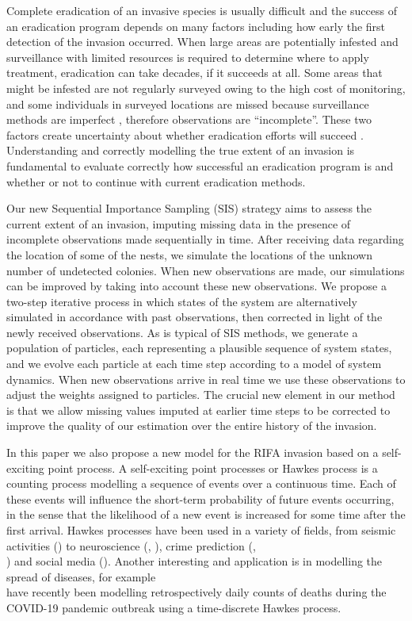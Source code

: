 \documentclass{article}
\begin{document}
Complete eradication of an invasive species is usually difficult and the success of an eradication program depends on many factors including how early the first detection of the invasion occurred. When large areas are potentially infested and surveillance with limited resources is required to determine where to apply treatment, eradication can take decades, if it succeeds at all. Some areas that might be infested are not regularly surveyed owing to the high cost of monitoring, and some individuals in surveyed locations are missed because surveillance methods are imperfect \cite{Royle}, therefore observations are “incomplete”. These two factors create uncertainty about whether eradication efforts will succeed  \cite{Keith}. Understanding and correctly modelling the true extent of an invasion is fundamental to evaluate correctly how successful an eradication program is and whether or not to continue with current eradication methods. 

Our new Sequential Importance Sampling (SIS) strategy aims to assess the current extent of an invasion, imputing missing data in the presence of incomplete observations made sequentially in time. After receiving data regarding the location of some of the nests, we simulate the locations of the unknown number of undetected colonies. When new observations are made, our simulations can be improved by taking into account these new observations. We propose a two-step iterative process in which states of the system are alternatively simulated in accordance with past observations, then corrected in light of the newly received observations. As is typical of SIS methods, we generate a population of particles, each representing a plausible sequence of system states, and we evolve each particle at each time step according to a model of system dynamics. When new observations arrive in real time we use these observations to adjust the weights assigned to particles. The crucial new element in our method is that we allow missing values imputed at earlier time steps to be corrected to improve the quality of our estimation over the entire history of the invasion.

In this paper we also propose a new model for the RIFA invasion based on a self-exciting point process. A self-exciting point processes or Hawkes process \cite{Hawkes71} is a counting process modelling a sequence of events over a continuous time. Each of these events will influence the short-term probability of future events occurring, in the sense that the likelihood of a new event is increased for some time after the first arrival. Hawkes processes have been used in a variety of fields, from seismic activities (\cite{Ogata88}) to neuroscience (\cite{Reynaud}, \cite{Chornoboy}), crime prediction (\cite{Mohler13}, \cite{White} \\ \cite{Reinhart2018}) and social media (\cite{Chen}). Another interesting and application is in modelling the spread of diseases, for example \\ \cite{Browning} have recently been modelling retrospectively daily counts of deaths during the COVID-19 pandemic outbreak using a time-discrete Hawkes process.
\end{document}
